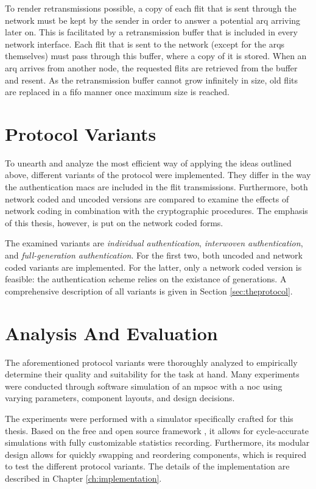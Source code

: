 To render retransmissions possible, a copy of each flit that is sent through the network must be kept by the sender in order to answer a potential
\gls{arq} arriving later on. This is facilitated by a retransmission buffer that is included in every network interface. Each flit that is sent to the
network (except for the \glspl{arq} themselves) must pass through this buffer, where a copy of it is stored. When an \gls{arq} arrives from another
node, the requested flits are retrieved from the buffer and resent. As the retransmission buffer cannot grow infinitely in size, old flits are
replaced in a \gls{fifo} manner once maximum size is reached.

\section{Protocol Variants}\label{sec:protocolvariants}
To unearth and analyze the most efficient way of applying the ideas outlined above, different variants of the protocol were implemented. They differ
in the way the authentication \glspl{mac} are included in the flit transmissions. Furthermore, both network coded and uncoded versions are compared to
examine the effects of network coding in combination with the cryptographic procedures. The emphasis of this thesis, however, is put on the network
coded forms.

The examined variants are \textit{individual authentication}, \textit{interwoven authentication}, and \textit{full-generation authentication}. For the
first two, both uncoded and network coded variants are implemented. For the latter, only a network coded version is feasible: the authentication
scheme relies on the existance of generations. A comprehensive description of all variants is given in Section
\ref{sec:theprotocol}. %

\section{Analysis And Evaluation}
The aforementioned protocol variants were thoroughly analyzed to empirically determine their quality and suitability for the task at hand. Many
experiments were conducted through software simulation of an \gls{mpsoc} with a \gls{noc} using varying parameters, component layouts, and design
decisions.

The experiments were performed with a simulator specifically crafted for this thesis. Based on the free and open source framework \omnet\cite{omnet}, it allows
for cycle-accurate simulations with fully customizable statistics recording. Furthermore, its modular design allows for quickly swapping and
reordering components, which is required to test the different protocol variants. The details of the implementation are described in Chapter
\ref{ch:implementation}.

